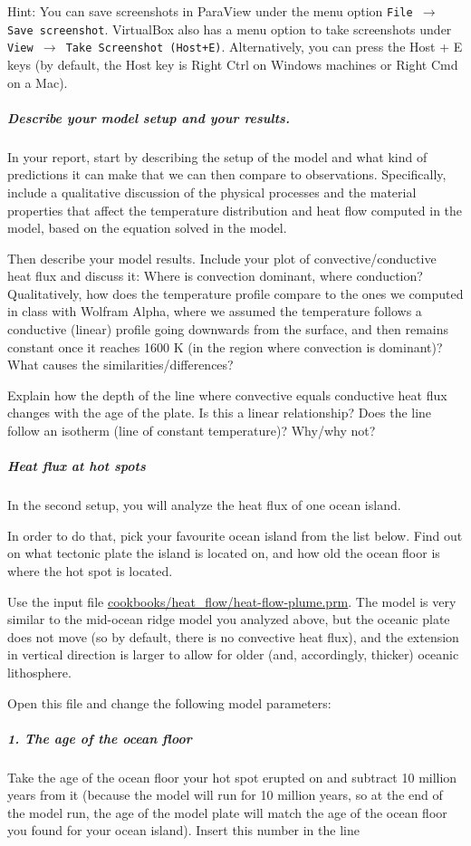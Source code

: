 Hint: You can save screenshots in ParaView under the menu option \texttt{File $\rightarrow$ Save screenshot}. VirtualBox also has a menu option to take screenshots under \texttt{View $\rightarrow$ Take Screenshot (Host+E)}. Alternatively, you can press the Host + E keys (by default, the Host key is Right Ctrl on Windows machines or Right Cmd on a Mac). 

\subparagraph{Describe your model setup and your results.}
In your report, start by describing the setup of the model and what kind of predictions it can make that we can then compare to observations. Specifically, include a qualitative discussion of the physical processes and the material properties that affect the temperature distribution and heat flow computed in the model, based on the equation solved in the model. 

Then describe your model results. Include your plot of convective/conductive heat flux and discuss it:
Where is convection dominant, where conduction? 
Qualitatively, how does the temperature profile compare to the ones we computed in class with Wolfram Alpha, 
where we assumed the temperature follows a conductive (linear) profile going downwards from the surface, 
and then remains constant once it reaches 1600 K (in the region where convection is dominant)? 
What causes the similarities/differences?

Explain how the depth of the line where convective equals conductive heat flux changes with the age of the plate. 
Is this a linear relationship? Does the line follow an isotherm (line of constant temperature)? Why/why not?

\subparagraph{Heat flux at hot spots}

In the second setup, you will analyze the heat flux of one ocean island.

In order to do that, pick your favourite ocean island from the list below. Find out on what tectonic plate the island is located on, and how old the ocean floor is where the hot spot is located. 

Use the input file \url{cookbooks/heat_flow/heat-flow-plume.prm}. 
The model is very similar to the mid-ocean ridge model you analyzed above, but the oceanic plate does not move
(so by default, there is no convective heat flux), and the extension in vertical direction is larger 
to allow for older (and, accordingly, thicker) oceanic lithosphere. 

Open this file and change the following model parameters:

\subparagraph{1. The age of the ocean floor}
Take the age of the ocean floor your hot spot erupted on and subtract 10 million years from it (because the model will run for 10 million years, so at the end of the model run, the age of the model plate will match the age of the ocean floor you found for your ocean island). 
Insert this number in the line

